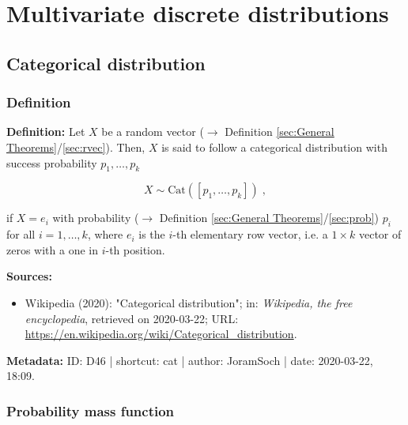 \documentclass[a4paper,12pt,twoside]{book}
\begin{document}
\pagebreak
\section{Multivariate discrete distributions}

\subsection{Categorical distribution}

\subsubsection[\textit{Definition}]{Definition} \label{sec:cat}
\setcounter{equation}{0}

\textbf{Definition:} Let $X$ be a random vector ($\rightarrow$ Definition \ref{sec:General Theorems}/\ref{sec:rvec}). Then, $X$ is said to follow a categorical distribution with success probability $p_1, \ldots, p_k$

\begin{equation} \label{eq:cat-cat}
X \sim \mathrm{Cat}(\left[p_1, \ldots, p_k \right]) \; ,
\end{equation}

if $X = e_i$ with probability ($\rightarrow$ Definition \ref{sec:General Theorems}/\ref{sec:prob}) $p_i$ for all $i = 1, \ldots, k$, where $e_i$ is the $i$-th elementary row vector, i.e. a $1 \times k$ vector of zeros with a one in $i$-th position.


\vspace{1em}
\textbf{Sources:}
\begin{itemize}
\item Wikipedia (2020): "Categorical distribution"; in: \textit{Wikipedia, the free encyclopedia}, retrieved on 2020-03-22; URL: \url{https://en.wikipedia.org/wiki/Categorical_distribution}.
\end{itemize}


\vspace{1em}
\textbf{Metadata:} ID: D46 | shortcut: cat | author: JoramSoch | date: 2020-03-22, 18:09.
\vspace{1em}



\subsubsection[\textbf{Probability mass function}]{Probability mass function} \label{sec:cat-pmf}
\setcounter{equation}{0}
\end{document}
